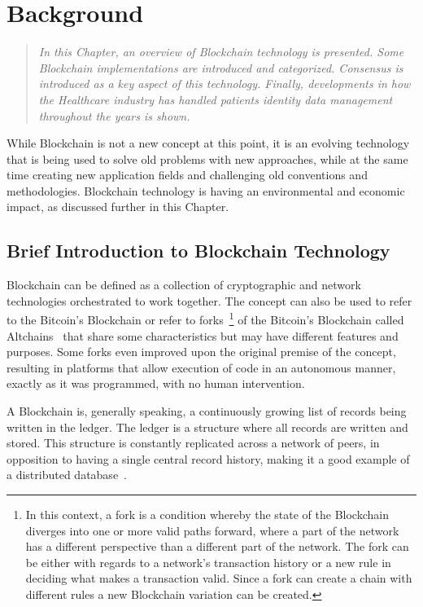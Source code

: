 \chapter{Background}\label{background}

\begin{quote} 
  \emph{In this Chapter, an overview of Blockchain technology is presented.
  Some Blockchain implementations are introduced and categorized. Consensus is
  introduced as a key aspect of this technology. Finally, developments in how
  the Healthcare industry has handled patients identity data management
  throughout the years is shown.}
\end{quote}


While Blockchain is not a new concept at this point, it is an evolving
technology that is being used to solve old problems with new approaches, while
at the same time creating new application fields and challenging old
conventions and methodologies.  Blockchain technology is having an
environmental and economic impact, as discussed further in this Chapter.

\section{Brief Introduction to Blockchain Technology}

Blockchain can be defined as a collection of cryptographic and network
technologies orchestrated to work together. The concept can also be used to
refer to the Bitcoin's Blockchain or refer to forks~\footnote{In this context,
a fork is a condition whereby the state of the Blockchain diverges into one or
more valid paths forward, where a part of the network has a different
perspective than a different part of the network. The fork can be either with
regards to a network's transaction history or a new rule in deciding what makes
a transaction valid. Since a fork can create a chain with different rules a new
Blockchain variation can be created.} of the Bitcoin's Blockchain called
Altchains~\cite{Lewis2015} that share some characteristics but may have
different features and purposes. Some forks even improved upon the original
premise of the concept, resulting in platforms that allow execution of code in
an autonomous manner, exactly as it was programmed, with no human intervention.

A Blockchain is, generally speaking, a continuously growing list of records
being written in the ledger. The ledger is a structure where all records are
written and stored. This structure is constantly replicated across a network of
peers, in opposition to having a single central record history, making it a
good example of a distributed database~\cite{Barclay2017}.

